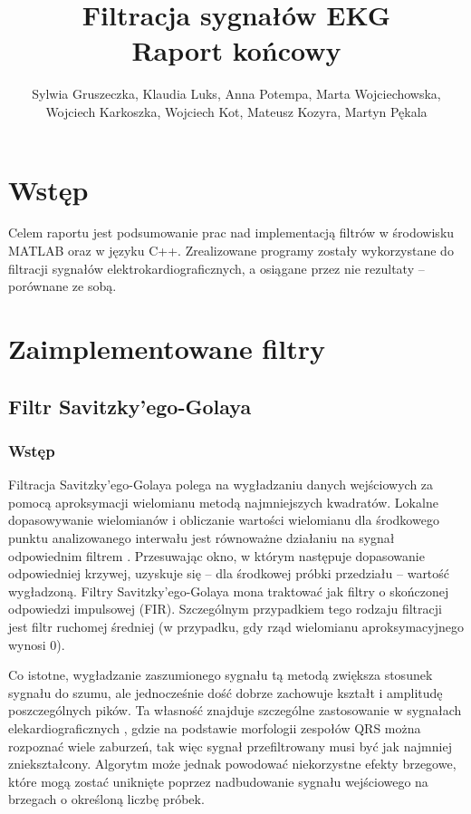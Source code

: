 \documentclass[a4paper]{article}
\title{Filtracja sygnałów EKG \\ Raport końcowy}
\author{Sylwia Gruszeczka, Klaudia Luks, Anna Potempa, Marta Wojciechowska, \\
Wojciech Karkoszka, Wojciech Kot, Mateusz Kozyra, Martyn Pękala}
\date{\formatdate{12}{01}{2017}}
\begin{document}
\maketitle
\section{Wstęp}

Celem raportu jest podsumowanie prac nad implementacją filtrów w środowisku MATLAB oraz w języku C++. Zrealizowane programy zostały wykorzystane do filtracji sygnałów elektrokardiograficznych, a osiągane przez nie rezultaty -- porównane ze sobą.

\section{Zaimplementowane filtry}


\subsection{Filtr Savitzky'ego-Golaya}

\subsubsection {Wstęp}

Filtracja Savitzky'ego-Golaya polega na wygładzaniu danych wejściowych za pomocą aproksymacji wielomianu metodą najmniejszych kwadratów. Lokalne dopasowywanie wielomianów i obliczanie wartości wielomianu dla środkowego punktu analizowanego interwału jest równoważne działaniu na sygnał odpowiednim filtrem \cite{on}. Przesuwając okno, w którym następuje dopasowanie odpowiedniej krzywej, uzyskuje się -- dla środkowej próbki przedziału -- wartość wygładzoną. Filtry Savitzky'ego-Golaya mona traktować jak filtry o skończonej odpowiedzi impulsowej (FIR). Szczególnym przypadkiem tego rodzaju filtracji jest filtr ruchomej średniej (w przypadku, gdy rząd wielomianu aproksymacyjnego wynosi 0).

Co istotne, wygładzanie zaszumionego sygnału tą metodą zwiększa stosunek sygnału do szumu, ale jednocześnie dość dobrze zachowuje kształt i amplitudę poszczególnych pików. Ta własność znajduje szczególne zastosowanie w sygnałach elekardiograficznych \cite{what}, gdzie na podstawie morfologii zespołów QRS można rozpoznać wiele zaburzeń, tak więc sygnał przefiltrowany musi być jak najmniej zniekształcony. Algorytm może jednak powodować niekorzystne efekty brzegowe, które mogą zostać uniknięte poprzez nadbudowanie sygnału wejściowego na brzegach o określoną liczbę próbek.
\end{document}
